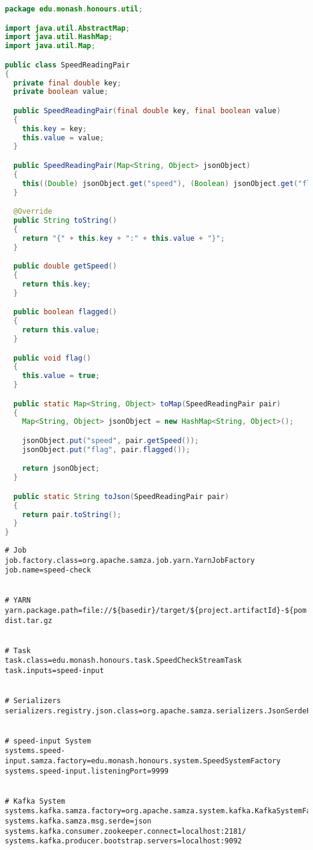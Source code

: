 \clearpage
\begin{lstlisting}[language=java,caption=edu.monash.honours.util.SpeedReadingPair (Java)]
package edu.monash.honours.util;

import java.util.AbstractMap;
import java.util.HashMap;
import java.util.Map;

public class SpeedReadingPair
{
  private final double key;
  private boolean value;

  public SpeedReadingPair(final double key, final boolean value)
  {
    this.key = key;
    this.value = value;
  }

  public SpeedReadingPair(Map<String, Object> jsonObject)
  {
    this((Double) jsonObject.get("speed"), (Boolean) jsonObject.get("flag"));
  }

  @Override
  public String toString()
  {
    return "{" + this.key + ":" + this.value + "}";
  }

  public double getSpeed()
  {
    return this.key;
  }

  public boolean flagged()
  {
    return this.value;
  }

  public void flag()
  {
    this.value = true;
  }

  public static Map<String, Object> toMap(SpeedReadingPair pair)
  {
    Map<String, Object> jsonObject = new HashMap<String, Object>();

    jsonObject.put("speed", pair.getSpeed());
    jsonObject.put("flag", pair.flagged());

    return jsonObject;
  }

  public static String toJson(SpeedReadingPair pair)
  {
    return pair.toString();
  }
}
\end{lstlisting}

\clearpage
\begin{lstlisting}[caption=SpeedCheckStreamTask (Samza config)]
# Job
job.factory.class=org.apache.samza.job.yarn.YarnJobFactory
job.name=speed-check


# YARN
yarn.package.path=file://${basedir}/target/${project.artifactId}-${pom.version}-dist.tar.gz


# Task
task.class=edu.monash.honours.task.SpeedCheckStreamTask
task.inputs=speed-input


# Serializers
serializers.registry.json.class=org.apache.samza.serializers.JsonSerdeFactory


# speed-input System
systems.speed-input.samza.factory=edu.monash.honours.system.SpeedSystemFactory
systems.speed-input.listeningPort=9999


# Kafka System
systems.kafka.samza.factory=org.apache.samza.system.kafka.KafkaSystemFactory
systems.kafka.samza.msg.serde=json
systems.kafka.consumer.zookeeper.connect=localhost:2181/
systems.kafka.producer.bootstrap.servers=localhost:9092
\end{lstlisting}


